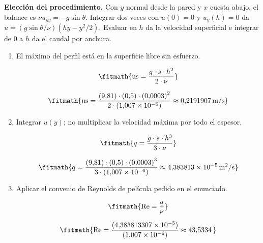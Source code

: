 \noindent\textbf{Elección del procedimiento.} Con $y$ normal desde la pared y $x$ cuesta abajo, el balance es $\nu u_{yy}=-g\sin\theta$. Integrar dos veces con $u(0)=0$ y $u_y(h)=0$ da $u=(g\sin\theta/\nu)(hy-y^2/2)$. Evaluar en $h$ da la velocidad superficial e integrar de 0 a $h$ da el caudal por anchura.

\begin{enumerate}

\item El máximo del perfil está en la superficie libre sin esfuerzo.

\[\fitmath{\mathrm{us}=\frac{g\cdot s\cdot {h}^{2}}{2\cdot \nu}}\]

\[\fitmath{\mathrm{us}=\frac{(9{,}81)\cdot (0{,}5)\cdot {(0{,}0003)}^{2}}{2\cdot (1{,}007\times10^{-6})}\approx 0{,}2191907\,\mathrm{m/s}}\]

\item Integrar $u(y)$; no multiplicar la velocidad máxima por todo el espesor.

\[\fitmath{q=\frac{g\cdot s\cdot {h}^{3}}{3\cdot \nu}}\]

\[\fitmath{q=\frac{(9{,}81)\cdot (0{,}5)\cdot {(0{,}0003)}^{3}}{3\cdot (1{,}007\times10^{-6})}\approx 4{,}383813\times10^{-5}\,\mathrm{m^{2}/s}}\]

\item Aplicar el convenio de Reynolds de película pedido en el enunciado.

\[\fitmath{\mathrm{Re}=\frac{q}{\nu}}\]

\[\fitmath{\mathrm{Re}=\frac{(4{,}383813307\times10^{-5})}{(1{,}007\times10^{-6})}\approx 43{,}5334\,}\]

\end{enumerate}
